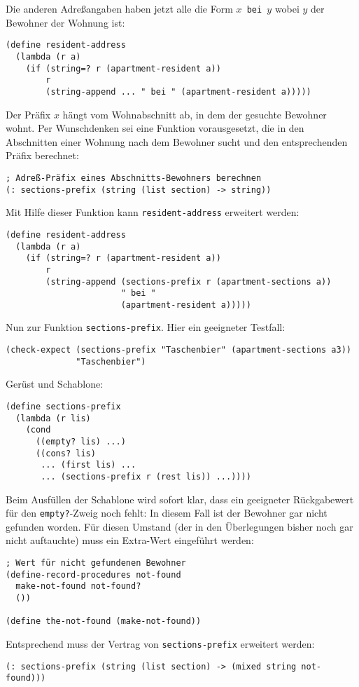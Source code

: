 Die anderen Adreßangaben haben jetzt alle die Form \texttt{$x$ bei
$y$} wobei $y$ der Bewohner der Wohnung ist:
%
\begin{verbatim}
(define resident-address
  (lambda (r a)
    (if (string=? r (apartment-resident a))
        r
        (string-append ... " bei " (apartment-resident a)))))
\end{verbatim}
%
Der Präfix $x$ hängt vom Wohnabschnitt ab, in dem der gesuchte
Bewohner wohnt.  Per Wunschdenken sei eine Funktion vorausgesetzt, die
in den Abschnitten einer Wohnung nach dem Bewohner sucht und den
entsprechenden Präfix berechnet:
%
\begin{verbatim}
; Adreß-Präfix eines Abschnitts-Bewohners berechnen
(: sections-prefix (string (list section) -> string))
\end{verbatim}
%
Mit Hilfe dieser Funktion kann \texttt{resident-address} erweitert
werden:
%
\begin{verbatim}
(define resident-address
  (lambda (r a)
    (if (string=? r (apartment-resident a))
        r
        (string-append (sections-prefix r (apartment-sections a))
                       " bei "
                       (apartment-resident a)))))
\end{verbatim}
%
Nun zur Funktion \texttt{sections-prefix}.  Hier ein geeigneter
Testfall:
%
\begin{verbatim}
(check-expect (sections-prefix "Taschenbier" (apartment-sections a3))
              "Taschenbier")
\end{verbatim}
%
Gerüst und Schablone:
%
\begin{verbatim}
(define sections-prefix
  (lambda (r lis)
    (cond
      ((empty? lis) ...)
      ((cons? lis)
       ... (first lis) ...
       ... (sections-prefix r (rest lis)) ...))))
\end{verbatim}
%
Beim Ausfüllen der Schablone wird sofort klar, dass ein geeigneter
Rückgabewert für den \texttt{empty?}-Zweig noch fehlt: In diesem Fall
ist der Bewohner gar nicht gefunden worden.  Für diesen Umstand (der
in den Überlegungen bisher noch gar nicht auftauchte) muss
ein Extra-Wert eingeführt werden:
%
\begin{verbatim}
; Wert für nicht gefundenen Bewohner
(define-record-procedures not-found
  make-not-found not-found?
  ())

(define the-not-found (make-not-found))
\end{verbatim}
%
Entsprechend muss der Vertrag von \texttt{sections-prefix} erweitert
werden:
%
\begin{verbatim}
(: sections-prefix (string (list section) -> (mixed string not-found)))
\end{verbatim}
